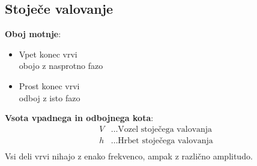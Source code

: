 {\color{indiagreen}\subsection{Stoječe valovanje}}
\textbf{Oboj motnje}:
\begin{itemize}
	\item Vpet konec vrvi\\
		obojo z nasprotno fazo
	\item Prost konec vrvi\\
		odboj z isto fazo
\end{itemize}
\textbf{Vsota vpadnega in odbojnega kota}:
\begin{align*}
	V &\dots \text{Vozel stoječega valovanja}\\
	h &\dots \text{Hrbet stoječega valovanja}\\
\end{align*}
Vsi deli vrvi nihajo z enako frekvenco, ampak z različno amplitudo.